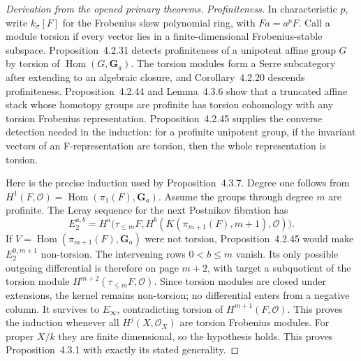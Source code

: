 \begin{proof}[Derivation from the opened primary theorems]
\emph{Profiniteness.}
In characteristic $p$, write $k_\sigma[F]$ for the Frobenius skew
polynomial ring, with $Fa=a^pF$. Call a module torsion if every vector
lies in a finite-dimensional Frobenius-stable subspace.
Proposition~4.2.31 detects profiniteness of a unipotent affine group
$G$ by torsion of $\operatorname{Hom}(G,\mathbf G_a)$.
The torsion modules form a Serre subcategory after extending to an
algebraic closure, and Corollary~4.2.20 descends profiniteness.
Proposition~4.2.44 and Lemma~4.3.6 show that a truncated affine stack
whose homotopy groups are profinite has torsion cohomology with any
torsion Frobenius representation. Proposition~4.2.45 supplies the
converse detection needed in the induction: for a profinite unipotent
group, if the invariant vectors of an F-representation are torsion,
then the whole representation is torsion.

Here is the precise induction used by Proposition~4.3.7. Degree one
follows from $H^1(F,\mathcal O)=\operatorname{Hom}(\pi_1(F),\mathbf G_a)$.
Assume the groups through degree $m$ are profinite. The Leray sequence
for the next Postnikov fibration has
\[
 E_2^{a,b}=
 H^a\bigl(\tau_{\le m}F,
 H^b(K(\pi_{m+1}(F),m+1),\mathcal O)\bigr).
\]
If $V=\operatorname{Hom}(\pi_{m+1}(F),\mathbf G_a)$ were not torsion,
Proposition~4.2.45 would make $E_2^{0,m+1}$ non-torsion.
The intervening rows $0<b\le m$ vanish. Its only possible outgoing
differential is therefore on page $m+2$, with target a subquotient
of the torsion module $H^{m+2}(\tau_{\le m}F,\mathcal O)$.
Since torsion modules are closed under extensions, the kernel remains
non-torsion; no differential enters from a negative column.
It survives to $E_\infty$, contradicting torsion of
$H^{m+1}(F,\mathcal O)$. This proves the induction whenever all
$H^j(X,\mathcal O_X)$ are torsion Frobenius modules.
For proper $X/k$ they are finite dimensional, so the hypothesis holds.
This proves Proposition~4.3.1 with exactly its stated generality.


\end{proof}
